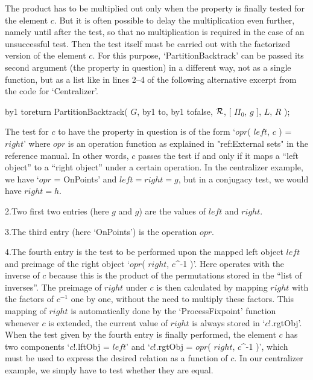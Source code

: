 The  product has to be multiplied  out only when  the property is finally
tested  for  the  element $c$. But  it  is  often possible  to  delay the
multiplication  even  further, namely  until after   the test, so  that no
multiplication is required in the case of  an unsuccessful test. Then the
test  itself  must be carried   out with the  factorized   version of the
element $c$.  For  this purpose,  `PartitionBacktrack' can  be passed its
second argument (the property  in question) in  a different way, not as a
single {\GAP} function, but as a list like in lines 2--4 of the following
alternative excerpt from the code for `Centralizer'.

{\newcount\lineno%
 \def\){\advance\lineno by1 \begingroup\obeylines\cloparen%
        \hbox to\manindent{\hfil $\scriptstyle\the\lineno$\enspace}}%
\)return PartitionBacktrack( $G$,
\)\quad [ $g$, $g$,
\)\qquad OnPoints,
\)\qquad $c$ -> $c$!.lftObj = $c$!.rgtObj ],
\)\quad false, ${\cal R}$, [ $\Pi_0$, $g$ ], $L$, $R$ );
  \vadjust{\allowbreak}%

}%
The test for $c$ to have the property in question  is of the form `$opr$(
$left$,  $c$  )  =  $right$' where  $opr$   is an  operation  function as
explained in "ref:External sets" in the reference manual. In other words,
$c$ passes the test if and only if it maps a ``left object'' to a ``right
object'' under  a certain operation. In  the centralizer example, we have
`$opr$ =  OnPoints' and $left = right  = g$, but  in a conjugacy test, we
would have $right = h$.

2.\enspace  Two first two  entries (here $g$ and  $g$)  are the values of
$left$ and $right$.

3.\enspace The third entry (here `OnPoints') is the operation $opr$.

4.\enspace The fourth  entry is the test to  be performed upon the mapped
left object $left$  and preimage  of  the right object `$opr$(   $right$,
$c$^-1 )'.  Here {\GAP} operates with the  inverse of $c$ because this is
the product of  the permutations stored  in the ``list of inverses''. The
preimage of $right$ under $c$ is then calculated by mapping $right$ with
the factors  of $c^{-1}$ one by one,  without the need  to multiply these
factors.    This mapping  of  $right$  is     automatically done by   the
`ProcessFixpoint' function whenever $c$ is extended, the current value of
$right$ is always  stored  in `$c$!.rgtObj'.  When the test  given by the
fourth entry  is finally performed,   the element $c$  has two components
`$c$!.lftObj =  $left$' and `$c$!.rgtObj  =   $opr$( $right$, $c$^-1  )',
which must be used to express the desired  relation as a function of $c$.
In our  centralizer  example, we simply  have  to test   whether they are
equal.


